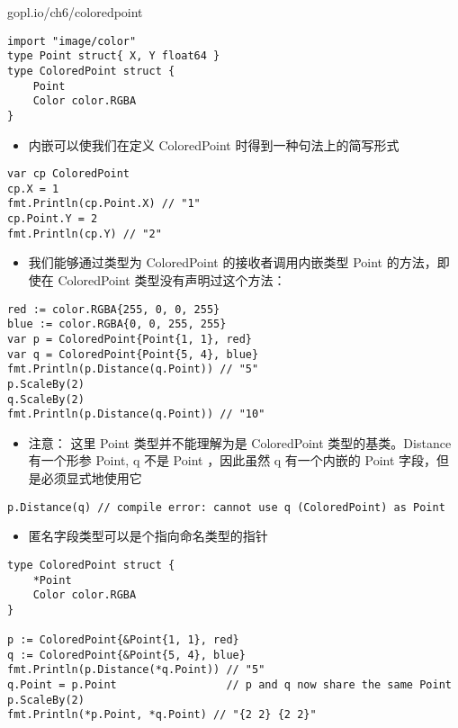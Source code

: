 gopl.io/ch6/coloredpoint

\begin{verbatim}
import "image/color"
type Point struct{ X, Y float64 }
type ColoredPoint struct {
    Point
    Color color.RGBA
}
\end{verbatim}

\begin{itemize}
\tightlist
\item
  内嵌可以使我们在定义 ColoredPoint 时得到一种句法上的简写形式
\end{itemize}

\begin{verbatim}
var cp ColoredPoint
cp.X = 1
fmt.Println(cp.Point.X) // "1"
cp.Point.Y = 2
fmt.Println(cp.Y) // "2"
\end{verbatim}

\begin{itemize}
\tightlist
\item
  我们能够通过类型为 ColoredPoint 的接收者调用内嵌类型 Point
  的方法，即使在 ColoredPoint 类型没有声明过这个方法：
\end{itemize}

\begin{verbatim}
red := color.RGBA{255, 0, 0, 255}
blue := color.RGBA{0, 0, 255, 255}
var p = ColoredPoint{Point{1, 1}, red}
var q = ColoredPoint{Point{5, 4}, blue}
fmt.Println(p.Distance(q.Point)) // "5"
p.ScaleBy(2)
q.ScaleBy(2)
fmt.Println(p.Distance(q.Point)) // "10"
\end{verbatim}

\begin{itemize}
\tightlist
\item
  注意： 这里 Point 类型并不能理解为是 ColoredPoint 类型的基类。Distance
  有一个形参 Point, q 不是 Point ，因此虽然 q 有一个内嵌的 Point
  字段，但是必须显式地使用它
\end{itemize}

\begin{verbatim}
p.Distance(q) // compile error: cannot use q (ColoredPoint) as Point
\end{verbatim}

\begin{itemize}
\tightlist
\item
  匿名字段类型可以是个指向命名类型的指针
\end{itemize}

\begin{verbatim}
type ColoredPoint struct {
    *Point
    Color color.RGBA
}

p := ColoredPoint{&Point{1, 1}, red}
q := ColoredPoint{&Point{5, 4}, blue}
fmt.Println(p.Distance(*q.Point)) // "5"
q.Point = p.Point                 // p and q now share the same Point
p.ScaleBy(2)
fmt.Println(*p.Point, *q.Point) // "{2 2} {2 2}"
\end{verbatim}

